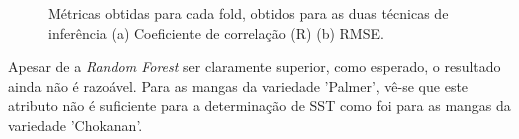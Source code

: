 \begin{figure}[H]
\centering
	\caption{Métricas obtidas para cada fold, obtidos para as duas técnicas de inferência (a) Coeficiente de correlação (R) (b) RMSE.}
	\label{fig:fold_sst_hue}
\end{figure}

Apesar de a \textit{Random Forest} ser claramente superior, como esperado, o resultado ainda não é razoável. Para as mangas da variedade 'Palmer', vê-se que este atributo não é suficiente para a determinação de SST como foi para as mangas da variedade 'Chokanan'.

